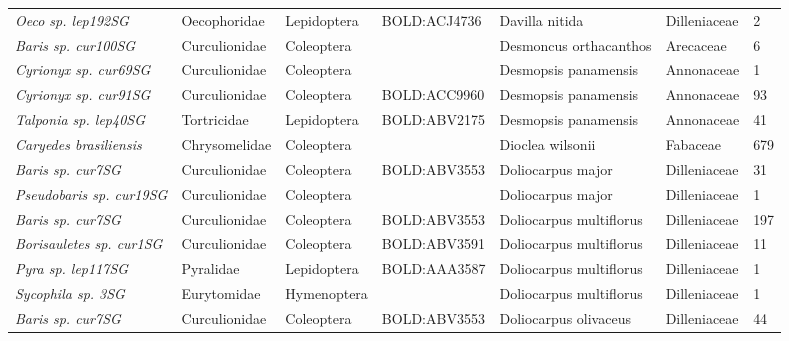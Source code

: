 \documentclass[11pt]{article}
\begin{document}
\begin{landscape}
\begin{longtable}{@{}lllllll@{}}
\textit{Oeco sp. lep192SG}                            & Oecophoridae    & Lepidoptera  & BOLD:ACJ4736 & Davilla nitida                     & Dilleniaceae     & 2     \\
\textit{Baris sp. cur100SG}                           & Curculionidae   & Coleoptera   &              & Desmoncus orthacanthos             & Arecaceae        & 6     \\
\textit{Cyrionyx sp. cur69SG}                         & Curculionidae   & Coleoptera   &              & Desmopsis panamensis               & Annonaceae       & 1     \\
\textit{Cyrionyx sp. cur91SG}                         & Curculionidae   & Coleoptera   & BOLD:ACC9960 & Desmopsis panamensis               & Annonaceae       & 93    \\
\textit{Talponia sp. lep40SG}                         & Tortricidae     & Lepidoptera  & BOLD:ABV2175 & Desmopsis panamensis               & Annonaceae       & 41    \\
\textit{Caryedes brasiliensis}                        & Chrysomelidae   & Coleoptera   &              & Dioclea wilsonii                   & Fabaceae         & 679   \\
\textit{Baris sp. cur7SG}                             & Curculionidae   & Coleoptera   & BOLD:ABV3553 & Doliocarpus major                  & Dilleniaceae     & 31    \\
\textit{Pseudobaris sp. cur19SG}                      & Curculionidae   & Coleoptera   &              & Doliocarpus major                  & Dilleniaceae     & 1     \\
\textit{Baris sp. cur7SG}                             & Curculionidae   & Coleoptera   & BOLD:ABV3553 & Doliocarpus multiflorus            & Dilleniaceae     & 197   \\
\textit{Borisauletes sp. cur1SG}                      & Curculionidae   & Coleoptera   & BOLD:ABV3591 & Doliocarpus multiflorus            & Dilleniaceae     & 11    \\
\textit{Pyra sp. lep117SG}                            & Pyralidae       & Lepidoptera  & BOLD:AAA3587 & Doliocarpus multiflorus            & Dilleniaceae     & 1     \\
\textit{Sycophila sp. 3SG}                            & Eurytomidae     & Hymenoptera  &              & Doliocarpus multiflorus            & Dilleniaceae     & 1     \\
\textit{Baris sp. cur7SG}                             & Curculionidae   & Coleoptera   & BOLD:ABV3553 & Doliocarpus olivaceus              & Dilleniaceae     & 44    \\

\end{longtable}
\end{landscape}
\end{document}
